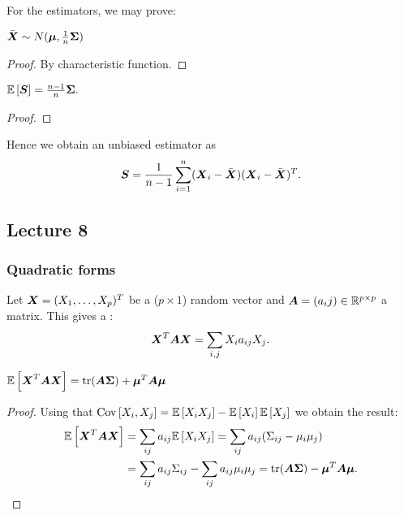 For the estimators, we may prove:
\begin{proposition}
    $\bar{\boldsymbol{X}} \sim N(\boldsymbol{\mu}, \frac{1}{n}\boldsymbol{\Sigma})$
\end{proposition}
\begin{proof}
    By characteristic function.
\end{proof}
\begin{proposition}
    $\mathbb{E}\left[\boldsymbol{S}\right] = \frac{n-1}{n} \boldsymbol{\Sigma}.$
\end{proposition}
\begin{proof}
    
\end{proof}
Hence we obtain an unbiased estimator as
$$
    \boldsymbol{S} = \frac{1}{n-1} \sum_{i=1}^n (\boldsymbol{X}_i-\bar{\boldsymbol{X}})(\boldsymbol{X}_i-\bar{\boldsymbol{X}})^T.
$$

\subsection*{Lecture 8}

\subsubsection{Quadratic forms}
Let $\boldsymbol{X}=(X_1,\dots,X_p)^T$ be a ($p\times 1$) random vector and $\boldsymbol{A}=(a_ij)\in\mathbb{R}^{p\times p}$ a matrix. This gives a :
$$
    \boldsymbol{X}^T\boldsymbol{A}\boldsymbol{X} = \sum_{i,j} X_ia_{ij}X_j.
$$ 
\begin{theorem} 
    $
        \mathbb{E}\left[\boldsymbol{X}^T\boldsymbol{A}\boldsymbol{X}\right] = \mathrm{tr}(\boldsymbol{A\Sigma}) + \boldsymbol{\mu}^T\boldsymbol{A}\boldsymbol{\mu}
    $    
\end{theorem} 
\begin{proof}
    Using that $\mathrm{Cov}\left[X_i,X_j\right] = \mathbb{E}\left[X_iX_j\right]-\mathbb{E}\left[X_i\right]\mathbb{E}\left[X_j\right]$ we obtain the result:
    \begin{align*}
        \mathbb{E}\left[\boldsymbol{X}^T\boldsymbol{A}\boldsymbol{X}\right]
        &= \sum_{ij}a_{ij}\mathbb{E}\left[X_iX_j\right]
        = \sum_{ij}a_{ij}(\Sigma_{ij}-\mu_i\mu_j)
        \\&= \sum_{ij}a_{ij}\Sigma_{ij} -  \sum_{ij}a_{ij}\mu_i\mu_j
        = \mathrm{tr}(\boldsymbol{A}\boldsymbol{\Sigma}) - \boldsymbol{\mu}^T\boldsymbol{A}\boldsymbol{\mu}.
    \end{align*}
\end{proof}

